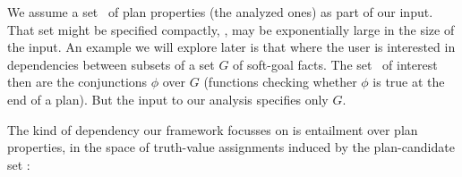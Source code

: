 We assume a set \props\ of plan properties (the analyzed ones) as part
of our input. That set might be specified compactly, \ie, may be
exponentially large in the size of the input. An example we will
explore later is that where the user is interested in dependencies
between subsets of a set $G$ of soft-goal facts. The set \props\ of
interest then are the conjunctions $\phi$ over $G$ (functions checking
whether $\phi$ is true at the end of a plan). But the input to our
analysis specifies only $G$.
%
%
%

The kind of dependency our framework focusses on is entailment over
plan properties, in the space of truth-value assignments induced by
the plan-candidate set \plans:



